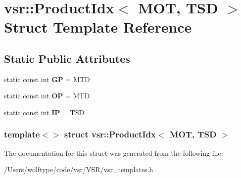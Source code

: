 \hypertarget{structvsr_1_1_product_idx_3_01_m_o_t_00_01_t_s_d_01_4}{\section{vsr\-:\-:Product\-Idx$<$ M\-O\-T, T\-S\-D $>$ Struct Template Reference}
\label{structvsr_1_1_product_idx_3_01_m_o_t_00_01_t_s_d_01_4}
}
\subsection*{Static Public Attributes}
\begin{DoxyCompactItemize}
\item 
\hypertarget{structvsr_1_1_product_idx_3_01_m_o_t_00_01_t_s_d_01_4_ac0f15e0374ceb1e646e5f7cab2c94bd7}{static const int {\bfseries G\-P} = M\-T\-D}\label{structvsr_1_1_product_idx_3_01_m_o_t_00_01_t_s_d_01_4_ac0f15e0374ceb1e646e5f7cab2c94bd7}

\item 
\hypertarget{structvsr_1_1_product_idx_3_01_m_o_t_00_01_t_s_d_01_4_a50bf85b1640d11c147d73984c4da9aa3}{static const int {\bfseries O\-P} = M\-T\-D}\label{structvsr_1_1_product_idx_3_01_m_o_t_00_01_t_s_d_01_4_a50bf85b1640d11c147d73984c4da9aa3}

\item 
\hypertarget{structvsr_1_1_product_idx_3_01_m_o_t_00_01_t_s_d_01_4_ab542de17e8c856b0771a6aad03064ac5}{static const int {\bfseries I\-P} = T\-S\-D}\label{structvsr_1_1_product_idx_3_01_m_o_t_00_01_t_s_d_01_4_ab542de17e8c856b0771a6aad03064ac5}

\end{DoxyCompactItemize}
\subsubsection*{template$<$$>$ struct vsr\-::\-Product\-Idx$<$ M\-O\-T, T\-S\-D $>$}



The documentation for this struct was generated from the following file\-:\begin{DoxyCompactItemize}
\item 
/\-Users/wolftype/code/vsr/\-V\-S\-R/vsr\-\_\-templates.\-h\end{DoxyCompactItemize}

